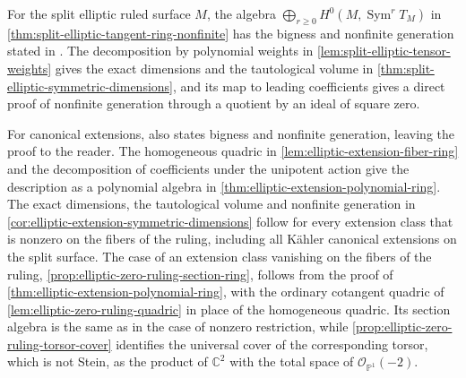 For the split elliptic ruled surface $M$, the algebra $\bigoplus_{r\geq0}H^0(M,\operatorname{Sym}^rT_M)$ in \cref{thm:split-elliptic-tangent-ring-nonfinite} has the bigness and nonfinite generation stated in \cite[v1, Theorem~1.4, p.~2, with proof on pp.~9--10]{DH26}. The decomposition by polynomial weights in \cref{lem:split-elliptic-tensor-weights} gives the exact dimensions and the tautological volume in \cref{thm:split-elliptic-symmetric-dimensions}, and its map to leading coefficients gives a direct proof of nonfinite generation through a quotient by an ideal of square zero.

For canonical extensions, \cite[v1, Remark~3.8, pp.~10--11]{DH26} also states bigness and nonfinite generation, leaving the proof to the reader. The homogeneous quadric in \cref{lem:elliptic-extension-fiber-ring} and the decomposition of coefficients under the unipotent action give the description as a polynomial algebra in \cref{thm:elliptic-extension-polynomial-ring}. The exact dimensions, the tautological volume and nonfinite generation in \cref{cor:elliptic-extension-symmetric-dimensions} follow for every extension class that is nonzero on the fibers of the ruling, including all K\"ahler canonical extensions on the split surface. The case of an extension class vanishing on the fibers of the ruling, \cref{prop:elliptic-zero-ruling-section-ring}, follows from the proof of \cref{thm:elliptic-extension-polynomial-ring}, with the ordinary cotangent quadric of \cref{lem:elliptic-zero-ruling-quadric} in place of the homogeneous quadric. Its section algebra is the same as in the case of nonzero restriction, while \cref{prop:elliptic-zero-ruling-torsor-cover} identifies the universal cover of the corresponding torsor, which is not Stein, as the product of $\mathbb C^2$ with the total space of $\mathcal O_{\mathbb P^1}(-2)$.
